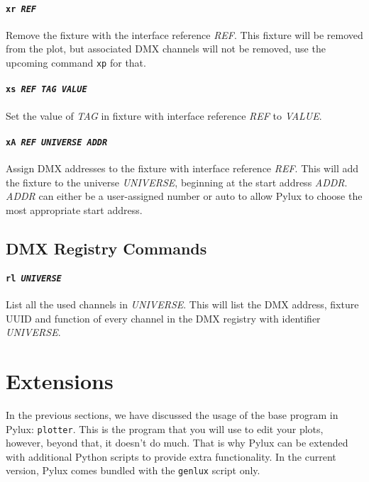 \documentclass[a4paper]{article}
\begin{document}
\paragraph{\texttt{xr \textit{REF}}}
Remove the fixture with the interface reference \textit{REF}. This fixture 
will be removed from the plot, but associated DMX channels will not be 
removed, use the upcoming command \texttt{xp} for that.

\paragraph{\texttt{xs \textit{REF TAG VALUE}}}
Set the value of \textit{TAG} in fixture with interface reference \textit{REF} 
to \textit{VALUE}.

\paragraph{\texttt{xA \textit{REF UNIVERSE ADDR}}}
Assign DMX addresses to the fixture with interface reference \textit{REF}.
This will add the fixture to the universe \textit{UNIVERSE}, beginning at the 
start address \textit{ADDR}. \textit{ADDR} can either be a user-assigned 
number or auto to allow Pylux to choose the most appropriate start address.

\subsection{DMX Registry Commands}

\paragraph{\texttt{rl \textit{UNIVERSE}}}
List all the used channels in \textit{UNIVERSE}. This will list the DMX 
address, fixture UUID and function of every channel in the DMX registry with 
identifier \textit{UNIVERSE}.

\section{Extensions}
In the previous sections, we have discussed the usage of the base program in 
Pylux: \texttt{plotter}. This is the program that you will use to edit your
plots, however, beyond that, it doesn't do much. That is why Pylux can be 
extended with additional Python scripts to provide extra functionality. In 
the current version, Pylux comes bundled with the \texttt{genlux} script only.
\end{document}
